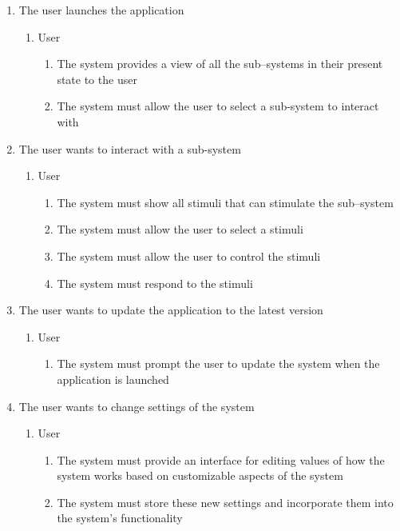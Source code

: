 \documentclass[]{article}
\begin{document}
\begin{enumerate}
	\item The user launches the application
	\begin{enumerate}
		\item User
			\begin{enumerate}
				\item The system provides a view of all the sub--systems in their present state to the user
				\item The system must allow the user to select a sub-system to interact with
			\end{enumerate}
	\end{enumerate}
	\item The user wants to interact with a sub-system
	\begin{enumerate}
		\item User
			\begin{enumerate}
				\item The system must show all stimuli that can stimulate the sub--system
				\item The system must allow the user to select a stimuli
				\item The system must allow the user to control the stimuli
				\item The system must respond to the stimuli
			\end{enumerate}
	\end{enumerate}
	\item The user wants to update the application to the latest version
	\begin{enumerate}
		\item User
			\begin{enumerate}
				\item The system must prompt the user to update the system when the application is launched
			\end{enumerate}
	\end{enumerate}
	\item The user wants to change settings of the system
	\begin{enumerate}
		\item User
			\begin{enumerate}
				\item The system must provide an interface for editing values of how the system works based on customizable aspects of the system
				\item The system must store these new settings and incorporate them into the system’s functionality
			\end{enumerate}

\end{enumerate}
\end{enumerate}
\end{document}
